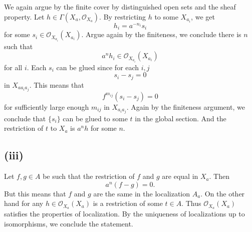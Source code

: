\documentclass{article}
\numberwithin{equation}{section}
\begin{document}
We again argue by the finite cover by distinguished open sets and the sheaf property. Let $h\in \Gamma(X_a,\mathcal{O}_{X_a})$. By restricting $h$ to some $X_{a_i}$, we get 
\begin{equation*}
h_i = a^{-n_i}s_i
\end{equation*}
for some $s_i\in \mathcal{O}_{X_{a_i}}(X_{a_i})$. Argue again by the finiteness, we conclude there is $n$ such that 
\begin{equation*}
a^{n}h_i\in\mathcal{O}_{X_{a_i}}(X_{a_i})
\end{equation*}
for all $i$. Each $s_i$ can be glued since for each $i,j$
\begin{equation*}
s_i-s_j = 0
\end{equation*}
in $X_{aa_ia_j}$. This means that 
\begin{equation*}
f^{m_{ij}}(s_i-s_j)=0
\end{equation*}
for sufficiently large enough $m_{ij}$ in $X_{a_ia_j}$. Again by the finiteness argument, we conclude that $\{s_i\}$ can be glued to some $t$ in the global section. And the restriction of $t$ to $X_a$ is $a^{n}h$ for some $n$.
\subsection*{(iii)}
Let $f,g\in A$ be such that the restriction of $f$ and $g$ are equal in $X_a$. Then 
\begin{equation*}
a^n(f-g) = 0.
\end{equation*}
But this means that $f$ and $g$ are the same in the localization $A_a$. On the other hand for any $h\in \mathcal{O}_{X_{a}}(X_{a})$ is a restriction of some $t\in A$. Thus $\mathcal{O}_{X_{a}}(X_{a})$ satisfies the properties of localization. By the uniqueness of localizations up to isomorphisms, we conclude the statement.
\end{document}
